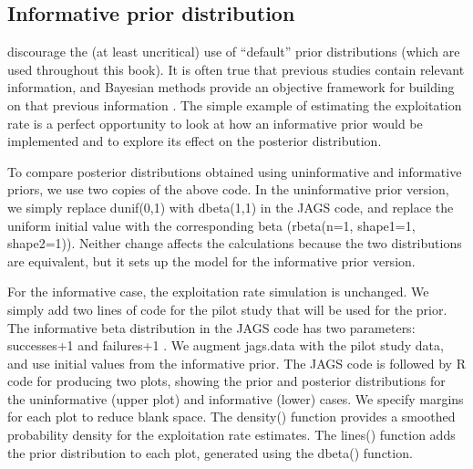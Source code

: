\documentclass[
]{krantz}
\begin{document}
\hypertarget{InformativePriors}{%
\subsection{Informative prior distribution}\label{InformativePriors}}

\citet{banner.etal_2020} discourage the (at least uncritical) use of ``default'' prior distributions (which are used throughout this book). It is often true that previous studies contain relevant information, and Bayesian methods provide an objective framework for building on that previous information \citep{mccarthy_2007}. The simple example of estimating the exploitation rate is a perfect opportunity to look at how an informative prior would be implemented and to explore its effect on the posterior distribution.

To compare posterior distributions obtained using uninformative and informative priors, we use two copies of the above code. In the uninformative prior version, we simply replace dunif(0,1) with dbeta(1,1) in the JAGS code, and replace the uniform initial value with the corresponding beta (rbeta(n=1, shape1=1, shape2=1)). Neither change affects the calculations because the two distributions are equivalent, but it sets up the model for the informative prior version.

For the informative case, the exploitation rate simulation is unchanged. We simply add two lines of code for the pilot study that will be used for the prior. The informative beta distribution in the JAGS code has two parameters: successes+1 and failures+1 \citep{bolker2008}. We augment jags.data with the pilot study data, and use initial values from the informative prior. The JAGS code is followed by R code for producing two plots, showing the prior and posterior distributions for the uninformative (upper plot) and informative (lower) cases. We specify margins for each plot to reduce blank space. The density() function provides a smoothed probability density for the exploitation rate estimates. The lines() function adds the prior distribution to each plot, generated using the dbeta() function.
\end{document}
